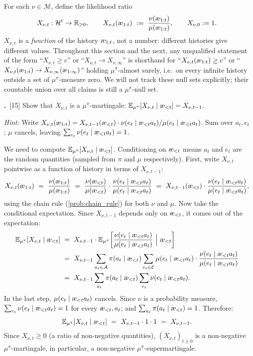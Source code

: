\documentclass[fontsize=11pt, parskip=half]{scrartcl}
\theoremstyle{definition}
\newenvironment{solution}{%
    \begin{tcolorbox}[colback=black!5!white, colframe=black!50!white,
      title={\textbf{Solution}}, fonttitle=\normalfont, breakable]
  }{\end{tcolorbox}}
\newenvironment{solution}{\expandafter\comment}{\expandafter\endcomment}
\newcommand{\mysubsection}[2]{\par\medskip\noindent\refstepcounter{subsection}\textbf{\thesubsection.}~#2\par\smallskip}
\newcommand{\cA}{\mathcal{A}}
\newcommand{\cE}{\mathcal{E}}
\newcommand{\cH}{\mathcal{H}}
\newcommand{\cM}{\mathcal{M}}
\newcommand{\Ex}{\mathbb{E}}
\newcommand{\aes}{\textnormal{\ae}}
\begin{document}
For each $\nu \in \cM$, define the likelihood ratio
\[
    X_{\nu,t} : \cH^t \to \mathbb{R}_{\geq 0}, \qquad X_{\nu,t}(\aes_{1:t}) ~:=~ \frac{\nu(\aes_{1:t})}{\mu(\aes_{1:t})}, \qquad X_{\nu,0} := 1.
\]
$X_{\nu,t}$ is a \emph{function} of the history $\aes_{1:t}$, not a number: different histories give different values. Throughout this section and the next, any unqualified statement of the form ``$X_{\nu,t} \geq c$'' or ``$X_{\nu,t} \to X_{\nu,\infty}$'' is shorthand for ``$X_{\nu,t}(\aes_{1:t}) \geq c$'' or ``$X_{\nu,t}(\aes_{1:t}) \to X_{\nu,\infty}(\aes_{1:\infty})$'' holding $\mu^\pi$-almost surely, i.e.\ on every infinite history outside a set of $\mu^\pi$-measure zero. We will not track these null sets explicitly; their countable union over all claims is still a $\mu^\pi$-null set.

\mysubsection{1}{[15] Show that $X_{\nu,t}$ is a $\mu^\pi$-martingale: $\Ex_{\mu^\pi}[X_{\nu,t} \mid \aes_{<t}] = X_{\nu,t-1}$. \label{prob:martingale}}

\textit{Hint:} Write $X_{\nu,t}(\aes_{1:t}) = X_{\nu,t-1}(\aes_{<t}) \cdot \nu(e_t \mid \aes_{<t} a_t)/\mu(e_t \mid \aes_{<t} a_t)$. Sum over $a_t, e_t$; $\mu$ cancels, leaving $\sum_{e_t} \nu(e_t \mid \aes_{<t} a_t) = 1$.

\begin{solution}
We need to compute $\Ex_{\mu^\pi}[X_{\nu,t} \mid \aes_{<t}]$. Conditioning on $\aes_{<t}$ means $a_t$ and $e_t$ are the random quantities (sampled from $\pi$ and $\mu$ respectively). First, write $X_{\nu,t}$ pointwise as a function of history in terms of $X_{\nu,t-1}$:
\[
    X_{\nu,t}(\aes_{1:t}) ~=~ \frac{\nu(\aes_{1:t})}{\mu(\aes_{1:t})}
    ~=~ \frac{\nu(\aes_{<t})}{\mu(\aes_{<t})} \cdot \frac{\nu(e_t \mid \aes_{<t} a_t)}{\mu(e_t \mid \aes_{<t} a_t)}
    ~=~ X_{\nu,t-1}(\aes_{<t}) \cdot \frac{\nu(e_t \mid \aes_{<t} a_t)}{\mu(e_t \mid \aes_{<t} a_t)},
\]
using the chain rule (\cref{prob:chain_rule}) for both $\nu$ and $\mu$. Now take the conditional expectation. Since $X_{\nu,t-1}$ depends only on $\aes_{<t}$, it comes out of the expectation:
\begin{align*}
    \Ex_{\mu^\pi}[X_{\nu,t} \mid \aes_{<t}]
    ~&=~ X_{\nu,t-1} \cdot \Ex_{\mu^\pi}\!\left[\frac{\nu(e_t \mid \aes_{<t} a_t)}{\mu(e_t \mid \aes_{<t} a_t)} ~\Big|~ \aes_{<t}\right] \\
    ~&=~ X_{\nu,t-1} \sum_{a_t \in \cA} \pi(a_t \mid \aes_{<t}) \sum_{e_t \in \cE} \mu(e_t \mid \aes_{<t} a_t) \cdot \frac{\nu(e_t \mid \aes_{<t} a_t)}{\mu(e_t \mid \aes_{<t} a_t)} \\
    ~&=~ X_{\nu,t-1} \sum_{a_t} \pi(a_t \mid \aes_{<t}) \sum_{e_t} \nu(e_t \mid \aes_{<t} a_t).
\end{align*}
In the last step, $\mu(e_t \mid \aes_{<t} a_t)$ cancels. Since $\nu$ is a probability measure, $\sum_{e_t} \nu(e_t \mid \aes_{<t} a_t) = 1$ for every $\aes_{<t}, a_t$; and $\sum_{a_t} \pi(a_t \mid \aes_{<t}) = 1$. Therefore:
\[
    \Ex_{\mu^\pi}[X_{\nu,t} \mid \aes_{<t}] ~=~ X_{\nu,t-1} \cdot 1 \cdot 1 ~=~ X_{\nu,t-1}.
\]
Since $X_{\nu,t} \geq 0$ (a ratio of non-negative quantities), $(X_{\nu,t})_{t \geq 0}$ is a non-negative $\mu^\pi$-martingale, in particular, a non-negative $\mu^\pi$-supermartingale.
\end{solution}
\end{document}
